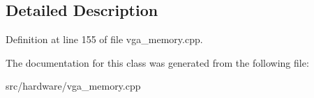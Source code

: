 \subsection{Detailed Description}


Definition at line 155 of file vga\-\_\-memory.\-cpp.



The documentation for this class was generated from the following file\-:\begin{DoxyCompactItemize}
\item 
src/hardware/vga\-\_\-memory.\-cpp\end{DoxyCompactItemize}
